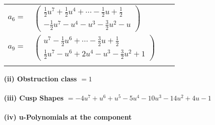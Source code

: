 \documentclass[1p]{elsarticle_modified}
\theoremstyle{definition}
\begin{document}
\begin{tabular}{m{7pt} m{180pt} m{7pt} m{180pt} }
\flushright $a_{6}=$&$\begin{pmatrix}\frac{1}{2} u^7+\frac{1}{2} u^4+\cdots-\frac{1}{2} u+\frac{1}{2}\\-\frac{1}{2} u^7- u^4- u^3-\frac{3}{2} u^2- u\end{pmatrix}$ \\
\flushright $a_{9}=$&$\begin{pmatrix}u^7-\frac{1}{2} u^6+\cdots-\frac{3}{2} u+\frac{1}{2}\\\frac{1}{2} u^7- u^6+2 u^4- u^3-\frac{3}{2} u^2+1\end{pmatrix}$\\&\end{tabular}
\flushleft \textbf{(ii) Obstruction class $= 1$}\\~\\
\flushleft \textbf{(iii) Cusp Shapes $= -4 u^7+u^6+u^5-5 u^4-10 u^3-14 u^2+4 u-1$}\\~\\
\newpage\renewcommand{\arraystretch}{1}
\flushleft \textbf{(iv) u-Polynomials at the component}\newline \\
\end{document}
